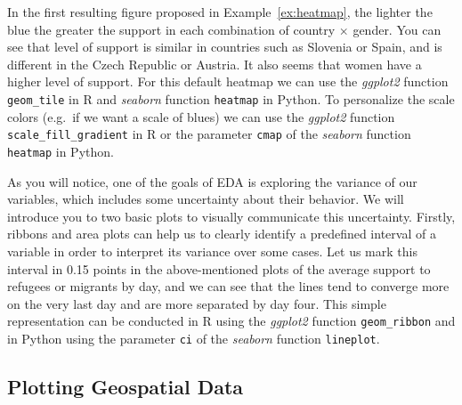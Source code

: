 In the first resulting figure proposed in Example~\ref{ex:heatmap}, the lighter the blue the greater the support in each combination of country $\times$ gender. You can see that level of support is similar in countries such as Slovenia or Spain, and is different in the Czech Republic or Austria. It also seems that women have a higher level of support. For this default heatmap we can use the \emph{ggplot2} function \texttt{geom\_tile} in R and \emph{seaborn} function \texttt{heatmap} in Python.  To personalize the scale colors (e.g.\ if we want a scale of blues) we can use the \emph{ggplot2} function \texttt{scale\_fill\_gradient} in R or the parameter \texttt{cmap} of the \emph{seaborn} function \texttt{heatmap} in Python.


As you will notice, one of the goals of EDA is exploring the variance of our variables, which includes some uncertainty about their behavior. We will introduce you to two basic plots to visually communicate this uncertainty. Firstly, ribbons and area plots can help us to clearly identify a predefined interval of a variable in order to interpret its variance over some cases. Let us mark this interval in 0.15 points in the above-mentioned plots of the average support to refugees or migrants by day, and we can see that the lines tend to converge more on the very last day and are more separated by day four. This simple representation can be conducted in R using the \emph{ggplot2} function \texttt{geom\_ribbon} and in Python using the parameter \texttt{ci} of the \emph{seaborn} function \texttt{lineplot}.





\subsection{Plotting Geospatial Data}\label{sec:plotgeo}

